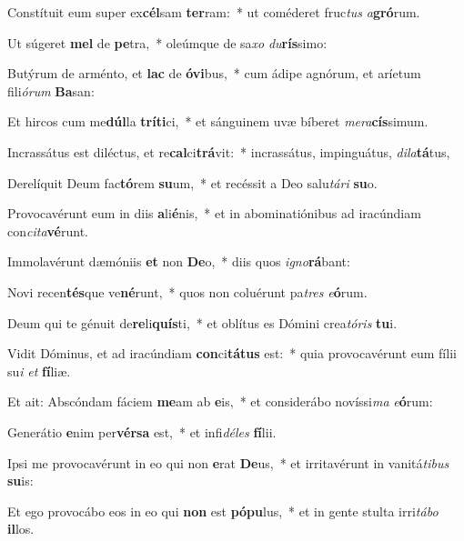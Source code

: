 \item Constítuit eum super ex\textbf{cél}sam \textbf{ter}ram:~* ut coméderet fruc\textit{tus} \textit{a}\textbf{gró}rum.
\item Ut súgeret \textbf{mel} de \textbf{pe}tra,~* oleúmque de sa\textit{xo} \textit{du}\textbf{rís}simo:
\item Butýrum de arménto, et \textbf{lac} de \textbf{ó}\textbf{vi}bus,~* cum ádipe agnórum, et aríetum fili\textit{ó}\textit{rum} \textbf{Ba}san:
\item Et hircos cum me\textbf{dúl}la \textbf{trí}\textbf{ti}ci,~* et sánguinem uvæ bíberet \textit{me}\textit{ra}\textbf{cís}simum.
\item Incrassátus est diléctus, et re\textbf{cal}ci\textbf{trá}vit:~* incrassátus, impinguátus, \textit{di}\textit{la}\textbf{tá}tus,
\item Derelíquit Deum fac\textbf{tó}rem \textbf{su}um,~* et recéssit a Deo salu\textit{tá}\textit{ri} \textbf{su}o.
\item Provocavérunt eum in diis \textbf{a}li\textbf{é}nis,~* et in abominatiónibus ad iracúndiam con\textit{ci}\textit{ta}\textbf{vé}runt.
\item Immolavérunt dæmóniis \textbf{et} non \textbf{De}o,~* diis quos \textit{i}\textit{gno}\textbf{rá}bant:
\item Novi recen\textbf{tés}que ve\textbf{né}runt,~* quos non coluérunt pa\textit{tres} \textit{e}\textbf{ó}rum.
\item Deum qui te génuit de\textbf{re}li\textbf{quís}ti,~* et oblítus es Dómini crea\textit{tó}\textit{ris} \textbf{tu}i.
\item Vidit Dóminus, et ad iracúndiam \textbf{con}ci\textbf{tá}\textbf{tus} est:~* quia provocavérunt eum fílii su\textit{i} \textit{et} \textbf{fí}liæ.
\item Et ait: Abscóndam fáciem \textbf{me}am ab \textbf{e}is,~* et considerábo novíssi\textit{ma} \textit{e}\textbf{ó}rum:
\item Generátio \textbf{e}nim per\textbf{vér}\textbf{sa} est,~* et infi\textit{dé}\textit{les} \textbf{fí}lii.
\item Ipsi me provocavérunt in eo qui non \textbf{e}rat \textbf{De}us,~* et irritavérunt in vanitá\textit{ti}\textit{bus} \textbf{su}is:
\item Et ego provocábo eos in eo qui \textbf{non} est \textbf{pó}\textbf{pu}lus,~* et in gente stulta irri\textit{tá}\textit{bo} \textbf{il}los.
